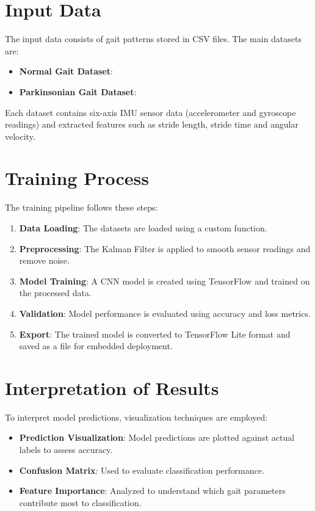 \section{Input Data}

The input data consists of gait patterns stored in CSV files. The main datasets are:

\begin{itemize}
	\item \textbf{Normal Gait Dataset}: 
	\item \textbf{Parkinsonian Gait Dataset}: 
\end{itemize}

Each dataset contains six-axis IMU sensor data (accelerometer and gyroscope readings) and extracted features such as stride length, stride time and angular velocity.

\section{Training Process}

The training pipeline follows these steps:

\begin{enumerate}
	\item \textbf{Data Loading}: The datasets are loaded using a custom  function.
	\item \textbf{Preprocessing}: The Kalman Filter is applied to smooth sensor readings and remove noise.
	\item \textbf{Model Training}: A CNN model is created using TensorFlow and trained on the processed data.
	\item \textbf{Validation}: Model performance is evaluated using accuracy and loss metrics.
	\item \textbf{Export}: The trained model is converted to TensorFlow Lite format and saved as a file  for embedded deployment.
\end{enumerate}

\section{Interpretation of Results}

To interpret model predictions, visualization techniques are employed:

\begin{itemize}
	\item \textbf{Prediction Visualization}: Model predictions are plotted against actual labels to assess accuracy.
	\item \textbf{Confusion Matrix}: Used to evaluate classification performance.
	\item \textbf{Feature Importance}: Analyzed to understand which gait parameters contribute most to classification.
\end{itemize}


